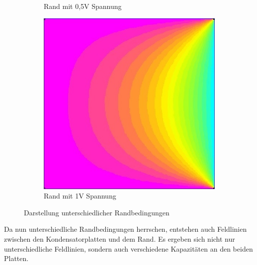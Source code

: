 \begin{figure}[h]
\begin{subfigure}[c]{0.32\textwidth}
		\caption{Rand mit 0,5V Spannung}
		\label{fig:0,5V}
	\end{subfigure}
	\begin{subfigure}[c]{0.32\textwidth}
		\includegraphics[width=\textwidth]{data/1VRandbedingung}
		\caption{Rand mit 1V Spannung}
		\label{fig:1V}
	\end{subfigure}
	\caption{Darstellung unterschiedlicher Randbedingungen}
\end{figure}

Da nun unterschiedliche Randbedingungen herrschen, entstehen auch Feldlinien zwischen den Kondensatorplatten und dem Rand. Es ergeben sich nicht nur unterschiedliche Feldlinien, sondern auch verschiedene Kapazitäten an den beiden Platten. 
\vspace*{1.5cm}

